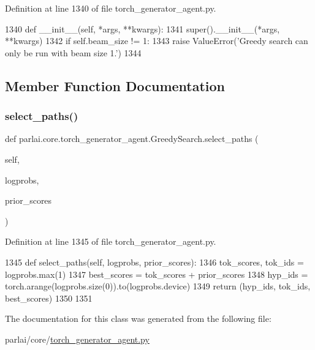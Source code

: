 Definition at line 1340 of file torch\+\_\+generator\+\_\+agent.\+py.


\begin{DoxyCode}
1340     \textcolor{keyword}{def }\_\_init\_\_(self, *args, **kwargs):
1341         super().\_\_init\_\_(*args, **kwargs)
1342         \textcolor{keywordflow}{if} self.beam\_size != 1:
1343             \textcolor{keywordflow}{raise} ValueError(\textcolor{stringliteral}{'Greedy search can only be run with beam size 1.'})
1344 
\end{DoxyCode}


\subsection{Member Function Documentation}
\mbox{\label{classparlai_1_1core_1_1torch__generator__agent_1_1GreedySearch_aa201e7824f50e2830cede9adc4bffcd6}} 
\subsubsection{\texorpdfstring{select\+\_\+paths()}{select\_paths()}}
{\footnotesize\ttfamily def parlai.\+core.\+torch\+\_\+generator\+\_\+agent.\+Greedy\+Search.\+select\+\_\+paths (\begin{DoxyParamCaption}\item[{}]{self,  }\item[{}]{logprobs,  }\item[{}]{prior\+\_\+scores }\end{DoxyParamCaption})}



Definition at line 1345 of file torch\+\_\+generator\+\_\+agent.\+py.


\begin{DoxyCode}
1345     \textcolor{keyword}{def }select\_paths(self, logprobs, prior\_scores):
1346         tok\_scores, tok\_ids = logprobs.max(1)
1347         best\_scores = tok\_scores + prior\_scores
1348         hyp\_ids = torch.arange(logprobs.size(0)).to(logprobs.device)
1349         \textcolor{keywordflow}{return} (hyp\_ids, tok\_ids, best\_scores)
1350 
1351 
\end{DoxyCode}


The documentation for this class was generated from the following file\+:\begin{DoxyCompactItemize}
\item 
parlai/core/\hyperlink{torch__generator__agent_8py}{torch\+\_\+generator\+\_\+agent.\+py}\end{DoxyCompactItemize}
